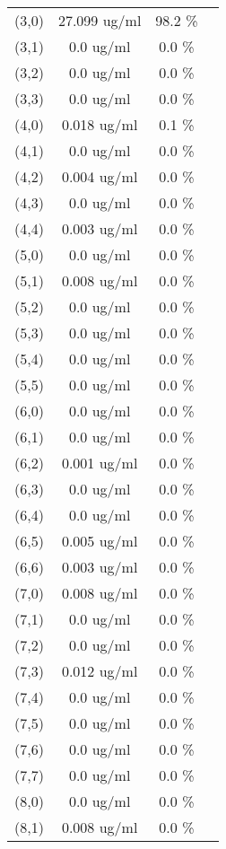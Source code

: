 \documentclass{article}
\begin{document}
\begin{tabular}{c c c c}
(3,0)&        27.099 ug/ml        &98.2 \%\\
(3,1)&        0.0 ug/ml        &0.0 \%\\
(3,2)&        0.0 ug/ml        &0.0 \%\\
(3,3)&        0.0 ug/ml        &0.0 \%\\
(4,0)&        0.018 ug/ml        &0.1 \%\\
(4,1)&        0.0 ug/ml        &0.0 \%\\
(4,2)&        0.004 ug/ml        &0.0 \%\\
(4,3)&        0.0 ug/ml        &0.0 \%\\
(4,4)&        0.003 ug/ml        &0.0 \%\\
(5,0)&        0.0 ug/ml        &0.0 \%\\
(5,1)&        0.008 ug/ml        &0.0 \%\\
(5,2)&        0.0 ug/ml        &0.0 \%\\
(5,3)&        0.0 ug/ml        &0.0 \%\\
(5,4)&        0.0 ug/ml        &0.0 \%\\
(5,5)&        0.0 ug/ml        &0.0 \%\\
(6,0)&        0.0 ug/ml        &0.0 \%\\
(6,1)&        0.0 ug/ml        &0.0 \%\\
(6,2)&        0.001 ug/ml        &0.0 \%\\
(6,3)&        0.0 ug/ml        &0.0 \%\\
(6,4)&        0.0 ug/ml        &0.0 \%\\
(6,5)&        0.005 ug/ml        &0.0 \%\\
(6,6)&        0.003 ug/ml        &0.0 \%\\
(7,0)&        0.008 ug/ml        &0.0 \%\\
(7,1)&        0.0 ug/ml        &0.0 \%\\
(7,2)&        0.0 ug/ml        &0.0 \%\\
(7,3)&        0.012 ug/ml        &0.0 \%\\
(7,4)&        0.0 ug/ml        &0.0 \%\\
(7,5)&        0.0 ug/ml        &0.0 \%\\
(7,6)&        0.0 ug/ml        &0.0 \%\\
(7,7)&        0.0 ug/ml        &0.0 \%\\
(8,0)&        0.0 ug/ml        &0.0 \%\\
(8,1)&        0.008 ug/ml        &0.0 \%\\

\end{tabular}
\end{document}
